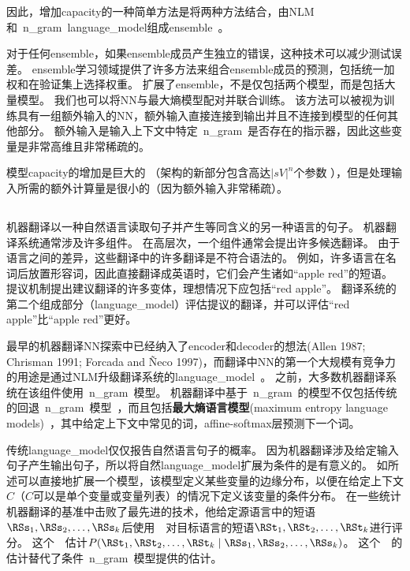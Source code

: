 因此，增加\gls{capacity}的一种简单方法是将两种方法结合，由\gls{NLM}和~\gls{n_gram}~\gls{language_model}组成\gls{ensemble}~\citep{BenDucVin01-small,Bengio-nnlm2003-small}。

对于任何\gls{ensemble}，如果\gls{ensemble}成员产生独立的错误，这种技术可以减少测试误差。
\gls{ensemble}学习领域提供了许多方法来组合\gls{ensemble}成员的预测，包括统一加权和在验证集上选择权重。
\citet{Mikolov-Interspeech-2011} 扩展了\gls{ensemble}，不是仅包括两个模型，而是包括大量模型。
我们也可以将\gls{NN}与最大熵模型配对并联合训练\citep{Mikolov-ASRU-2011}。
该方法可以被视为训练具有一组额外输入的\gls{NN}，额外输入直接连接到输出并且不连接到模型的任何其他部分。
额外输入是输入上下文中特定~\gls{n_gram}~是否存在的指示器，因此这些变量是非常高维且非常稀疏的。

模型\gls{capacity}的增加是巨大的 （架构的新部分包含高达$| sV |^n$个参数 ），但是处理输入所需的额外计算量是很小的（因为额外输入非常稀疏）。

\subsection{}
\label{sec:neural_machine_translation}

机器翻译以一种自然语言读取句子并产生等同含义的另一种语言的句子。
机器翻译系统通常涉及许多组件。
在高层次，一个组件通常会提出许多候选翻译。
由于语言之间的差异，这些翻译中的许多翻译是不符合语法的。
例如，许多语言在名词后放置形容词，因此直接翻译成英语时，它们会产生诸如``apple red''的短语。
提议机制提出建议翻译的许多变体，理想情况下应包括``red apple''。
翻译系统的第二个组成部分（\gls{language_model}）评估提议的翻译，并可以评估``red apple''比``apple red''更好。


最早的机器翻译\gls{NN}探索中已经纳入了\gls{encoder}和\gls{decoder}的想法(Allen 1987; Chrisman 1991; Forcada
and Ñeco 1997)，而翻译中\gls{NN}的第一个大规模有竞争力的用途是通过\gls{NLM}升级翻译系统的\gls{language_model}~\citep{Schwenk-et-al-IWSLT2006,Schwenk-2010}。
之前，大多数机器翻译系统在该组件使用~\gls{n_gram}~模型。
机器翻译中基于~\gls{n_gram}~的模型不仅包括传统的回退~\gls{n_gram}~模型~\citep{Jelinek+Mercer80,Katz87,Chen+Goodman99}，而且包括\textbf{最大熵语言模型}(maximum entropy language models)~\citep{MaxEnt96}，其中给定上下文中常见的词，affine-softmax层预测下一个词。

传统\gls{language_model}仅仅报告自然语言句子的概率。
因为机器翻译涉及给定输入句子产生输出句子，所以将自然\gls{language_model}扩展为条件的是有意义的。
如所述可以直接地扩展一个模型，该模型定义某些变量的边缘分布，以便在给定上下文$C$（$C$可以是单个变量或变量列表）的情况下定义该变量的条件分布。
\citet{Devlin-et-al-ACL2014}在一些统计机器翻译的基准中击败了最先进的技术，他给定源语言中的短语$\RSs_1, \RSs_2,\ldots, \RSs_k$后使用~~对目标语言的短语$\RSt_1, \RSt_2,\ldots, \RSt_k$进行评分。
这个~~估计$P(\RSt_1, \RSt_2,\ldots, \RSt_k \mid \RSs_1, \RSs_2,\ldots, \RSs_k)$。
这个~~的估计替代了条件~\gls{n_gram}~模型提供的估计。


